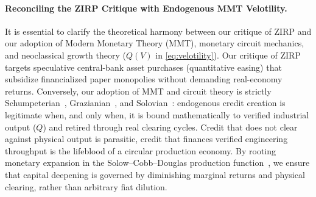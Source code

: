 \documentclass[a4paper,11pt,twoside,parskip=half-,headings=small]{scrartcl}
\begin{document}
\paragraph{Reconciling the ZIRP Critique with Endogenous MMT Velotility.}
It is essential to clarify the theoretical harmony between our critique of ZIRP and our adoption of Modern Monetary Theory (MMT), monetary circuit mechanics, and neoclassical growth theory ($Q(V)$ in \cref{eq:velotility}). Our critique of ZIRP targets speculative central-bank asset purchases (quantitative easing) that subsidize financialized paper monopolies without demanding real-economy returns. Conversely, our adoption of MMT and circuit theory is strictly Schumpeterian~\cite{schumpeter1934}, Grazianian~\cite{graziani2003}, and Solovian~\cite{solow1956}: endogenous credit creation is legitimate when, and only when, it is bound mathematically to verified industrial output ($Q$) and retired through real clearing cycles. Credit that does not clear against physical output is parasitic, credit that finances verified engineering throughput is the lifeblood of a circular production economy. By rooting monetary expansion in the Solow--Cobb--Douglas production function~\cite{cobbdouglas1928}, we ensure that capital deepening is governed by diminishing marginal returns and physical clearing, rather than arbitrary fiat dilution.
\end{document}
